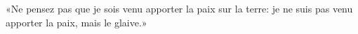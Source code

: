 \encetemps \jesusdisciples
	«Ne pensez pas que je sois venu apporter la paix sur la terre:
	je ne suis pas venu apporter la paix, mais le glaive.»
